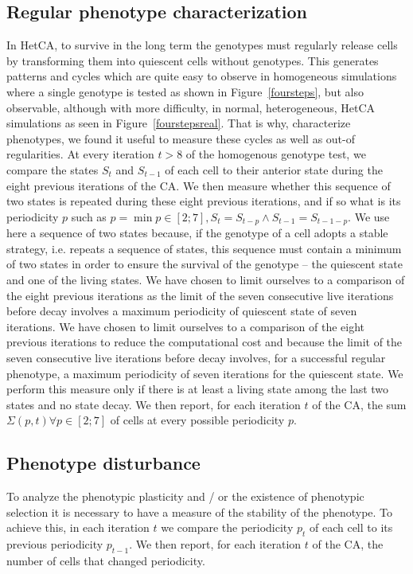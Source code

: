 \documentclass[letterpaper]{article}
\begin{document}
\subsection{Regular phenotype characterization} 
In HetCA, to survive in the long term the genotypes must regularly release cells by transforming them into quiescent cells without genotypes. This generates patterns and cycles which are quite easy to observe in homogeneous simulations where a single genotype is tested as shown in Figure~\ref{foursteps}, but also observable, although with more difficulty, in normal, heterogeneous, HetCA simulations as seen in Figure~\ref{fourstepsreal}. That is why, characterize phenotypes, we found it useful to measure these cycles as well as out-of regularities. At every iteration $t>8$ of the homogenous genotype test, we compare the states $S_t$ and $S_{t-1}$ of each cell to their anterior state during the eight previous iterations of the CA. We then measure whether this sequence of two states is repeated during these eight previous iterations, and if so what is its periodicity $p$ such as $p=\min p \in [2;7], S_t=S_{t-p} \wedge S_{t-1}=S_{t-1-p}$. We use here a sequence of two states because, if the genotype of a cell adopts a stable strategy, i.e. repeats a sequence of states, this sequence must contain a minimum of two states in order to ensure the survival of the genotype -- the quiescent state and one of the living states. We have chosen to limit ourselves to a comparison of the eight previous iterations as the limit of the seven consecutive live iterations before decay involves a maximum periodicity of quiescent state of seven iterations. We have chosen to limit ourselves to a comparison of the eight previous iterations to reduce the computational cost and because the limit of the seven consecutive live iterations before decay involves, for a successful regular phenotype, a maximum periodicity of seven iterations for the quiescent state. We perform this measure only if there is at least a living state among the last two states and no state decay. We then report, for each iteration $t$ of the CA, the sum $\Sigma(p,t)\forall p \in [2;7]$ of cells at every possible periodicity $p$. 

\subsection{Phenotype disturbance} 
To analyze the phenotypic plasticity and / or the existence of phenotypic selection it is necessary to have a measure of the stability of the phenotype. To achieve this, in each iteration $t$ we compare the periodicity $p_t$ of each cell to its previous periodicity $p_{t-1}$. We then report, for each iteration $t$ of the CA, the number of cells that changed periodicity.
 
\end{document}
